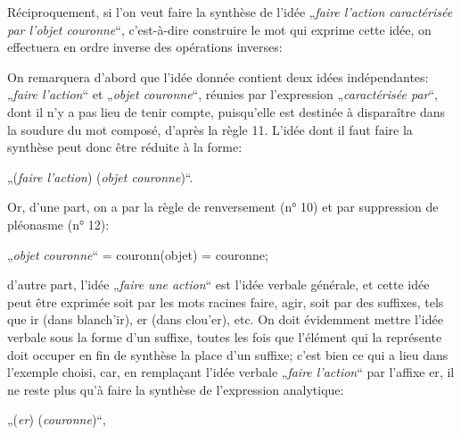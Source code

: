 {{      }

      Réciproquement, si l’on veut faire la synthèse de l’idée
      „\emph{faire l’action caractérisée par l’objet couronne}“,
      c’est-à-dire construire le mot qui exprime cette idée, on
      effectuera en ordre inverse des opérations inverses:

      On remarquera d’abord que l’idée donnée contient deux idées
      indépendantes: „\emph{faire l’action}“ et „\emph{objet
        couronne}“, réunies par l’expression „\emph{caractérisée
        par}“, dont il n’y a pas lieu de tenir compte, puisqu’elle est
      destinée à disparaître dans la soudure du mot composé, d’après
      la règle 11. L’idée dont il faut faire la synthèse peut donc
      être réduite à la forme:
    
     {\centering „(\emph{faire l’action}) (\emph{objet couronne})“.\\[0.5ex]

       }

    Or, d’une part, on a par la règle de renversement (n° 10) et par
    suppression de pléonasme (n° 12):
    
      {\centering„\emph{objet couronne}“ = \textup{couronn}(\textup{objet}) =
      \textup{couronne};

      }

    \noindent d’autre part, l’idée „\emph{faire une action}“ est l’idée verbale
    générale, et cette idée peut être exprimée soit par les mots
    racines \textup{faire}, \textup{agir}, soit par des suffixes, tels
    que \textup{ir} (dans \textup{blanch'ir}), \textup{er} (dans
    \textup{clou'er}), etc. On doit évidemment mettre l’idée verbale
    sous la forme d’un suffixe, toutes les fois que l’élément qui la
    représente doit occuper en fin de synthèse la place d’un suffixe;
    c’est bien ce qui a lieu dans l’exemple choisi, car, en remplaçant
    l’idée verbale „\emph{faire l’action}“ par l’affixe \textup{er}, il ne reste plus
    qu’à faire la synthèse de l’expression analytique:
    
     {\centering „(\emph{er}) (\emph{couronne})“,

     }

  }


